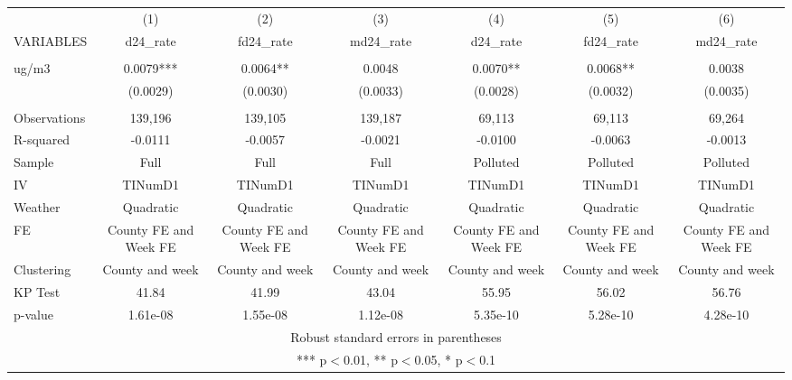 \begin{tabular}{lcccccc} \hline
 & (1) & (2) & (3) & (4) & (5) & (6) \\
VARIABLES & d24\_rate & fd24\_rate & md24\_rate & d24\_rate & fd24\_rate & md24\_rate \\ \hline
 &  &  &  &  &  &  \\
ug/m3 & 0.0079*** & 0.0064** & 0.0048 & 0.0070** & 0.0068** & 0.0038 \\
 & (0.0029) & (0.0030) & (0.0033) & (0.0028) & (0.0032) & (0.0035) \\
 &  &  &  &  &  &  \\
Observations & 139,196 & 139,105 & 139,187 & 69,113 & 69,113 & 69,264 \\
R-squared & -0.0111 & -0.0057 & -0.0021 & -0.0100 & -0.0063 & -0.0013 \\
Sample & Full & Full & Full & Polluted & Polluted & Polluted \\
IV & TINumD1 & TINumD1 & TINumD1 & TINumD1 & TINumD1 & TINumD1 \\
Weather & Quadratic & Quadratic & Quadratic & Quadratic & Quadratic & Quadratic \\
FE & County FE and Week FE & County FE and Week FE & County FE and Week FE & County FE and Week FE & County FE and Week FE & County FE and Week FE \\
Clustering & County and week & County and week & County and week & County and week & County and week & County and week \\
KP Test & 41.84 & 41.99 & 43.04 & 55.95 & 56.02 & 56.76 \\
 p-value & 1.61e-08 & 1.55e-08 & 1.12e-08 & 5.35e-10 & 5.28e-10 & 4.28e-10 \\ \hline
\multicolumn{7}{c}{ Robust standard errors in parentheses} \\
\multicolumn{7}{c}{ *** p$<$0.01, ** p$<$0.05, * p$<$0.1} \\
\end{tabular}
